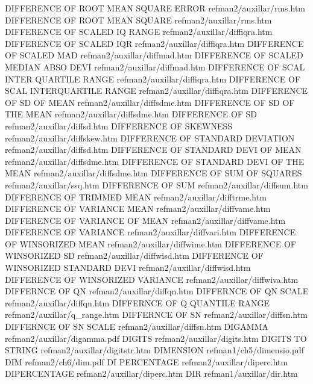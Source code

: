 DIFFERENCE OF ROOT MEAN SQUARE ERROR    refman2/auxillar/rms.htm
DIFFERENCE OF ROOT MEAN SQUARE          refman2/auxillar/rms.htm
DIFFERENCE OF SCALED IQ RANGE           refman2/auxillar/diffiqra.htm
DIFFERENCE OF SCALED IQR                refman2/auxillar/diffiqra.htm
DIFFERENCE OF SCALED MAD                refman2/auxillar/diffmad.htm
DIFFERENCE OF SCALED MEDIAN ABSO DEVI   refman2/auxillar/diffmad.htm
DIFFERENCE OF SCAL INTER QUARTILE RANGE refman2/auxillar/diffiqra.htm
DIFFERENCE OF SCAL INTERQUARTILE RANGE  refman2/auxillar/diffiqra.htm
DIFFERENCE OF SD OF MEAN                refman2/auxillar/diffsdme.htm
DIFFERENCE OF SD OF THE MEAN            refman2/auxillar/diffsdme.htm
DIFFERENCE OF SD                        refman2/auxillar/diffsd.htm
DIFFERENCE OF SKEWNESS                  refman2/auxillar/diffskew.htm
DIFFERENCE OF STANDARD DEVIATION        refman2/auxillar/diffsd.htm
DIFFERENCE OF STANDARD DEVI OF MEAN     refman2/auxillar/diffsdme.htm
DIFFERENCE OF STANDARD DEVI OF THE MEAN refman2/auxillar/diffsdme.htm
DIFFERENCE OF SUM OF SQUARES            refman2/auxillar/ssq.htm
DIFFERENCE OF SUM                       refman2/auxillar/diffsum.htm
DIFFERENCE OF TRIMMED MEAN              refman2/auxillar/difftrme.htm
DIFFERENCE OF VARIANCE MEAN             refman2/auxillar/diffvame.htm
DIFFERENCE OF VARIANCE OF MEAN          refman2/auxillar/diffvame.htm
DIFFERENCE OF VARIANCE                  refman2/auxillar/diffvari.htm
DIFFERENCE OF WINSORIZED MEAN           refman2/auxillar/diffwime.htm
DIFFERENCE OF WINSORIZED SD             refman2/auxillar/diffwisd.htm
DIFFERENCE OF WINSORIZED STANDARD DEVI  refman2/auxillar/diffwisd.htm
DIFFERENCE OF WINSORIZED VARIANCE       refman2/auxillar/diffwiva.htm
DIFFERNCE OF QN                         refman2/auxillar/diffqn.htm
DIFFERNCE OF QN SCALE                   refman2/auxillar/diffqn.htm
DIFFERNCE OF Q QUANTILE RANGE           refman2/auxillar/q_range.htm
DIFFERNCE OF SN                         refman2/auxillar/diffsn.htm
DIFFERNCE OF SN SCALE                   refman2/auxillar/diffsn.htm
DIGAMMA                                 refman2/auxillar/digamma.pdf
DIGITS                                  refman2/auxillar/digits.htm
DIGITS TO STRING                        refman2/auxillar/digitstr.htm
DIMENSION                               refman1/ch5/dimensio.pdf
DIM                                     refman2/ch6/dim.pdf
DI PERCENTAGE                           refman2/auxillar/diperc.htm
DIPERCENTAGE                            refman2/auxillar/diperc.htm
DIR                                     refman1/auxillar/dir.htm
